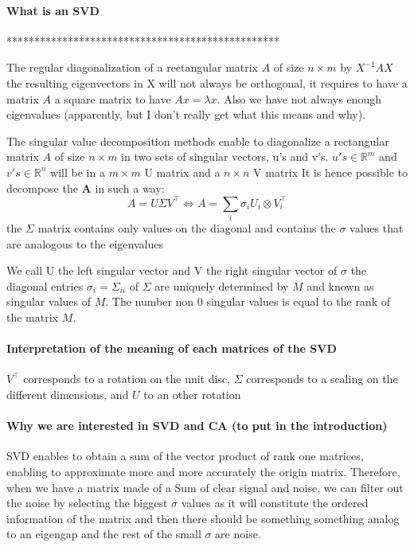 \documentclass{article}
\begin{document}
\paragraph{What is an SVD}




*************************************************

The regular diagonalization of a rectangular matrix $A$ of size $n \times m$ by $X^{-1} AX$ the resulting eigenvectors in X will not always be orthogonal, it requires to have a matrix $A$ a square matrix to have $Ax = \lambda x$. Also we have not always enough eigenvalues (apparently, but I don't really get what this means and why).

The singular value decomposition methods enable to diagonalize a rectangular matrix $A$ of size $n \times m$ in two sets of singular vectors, u's and v's. 
$u's \in \mathbb{R}^m$ and $v's \in \mathbb{R}^n$ will be in a $m \times m$ U matrix and a $n \times n$ V matrix
It is hence possible to decompose the $\textbf{A}$ in such a way:
$$A = U \Sigma V^\intercal \Leftrightarrow A = \sum_i \sigma_i U_i \otimes V_i^\intercal$$
the  $\Sigma$ matrix contains only values on the diagonal and contains the $\sigma$ values that are analogous to the eigenvalues 

We call U the left singular vector and V the right singular vector of $\sigma$
the diagonal entries $\sigma_i = \Sigma_{ii}$ of $\Sigma$ are uniquely determined by $M$ and known as singular values of $M$. The number non 0 singular values is equal to the rank of the matrix $M$.

\paragraph{Interpretation of the meaning of each matrices of the SVD}

$V^\intercal$ corresponds to a rotation on the unit disc, $\Sigma$ corresponds to a  scaling on the different dimensions, and $U$ to an other rotation 

\paragraph{Why we are interested in SVD and CA (to put in the introduction)}

SVD enables to obtain a sum of the vector product of rank one matrices, enabling to approximate more and more accurately the origin matrix. Therefore, when we have a matrix made of a Sum of clear signal and noise, we can filter out the noise by selecting the biggest $\sigma$ values as it will constitute the ordered information of the matrix and then there should be something something analog to an eigengap and the rest of the small $\sigma$ are noise.
\end{document}
